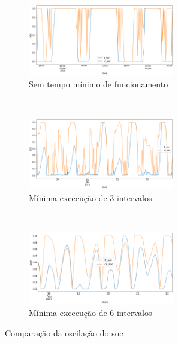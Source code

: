 
\begin{figure}[H]
	\centering
	\begin{subfigure}{\textwidth}
		\centering
		\includegraphics[width=0.7\textwidth]{../img/soc.png}
		\caption{Sem tempo mínimo de funcionamento}\label{fig:soc0}
	\end{subfigure}
	\\ \vspace{1cm}
	\begin{subfigure}{\textwidth}
		\centering
		\includegraphics[width=0.7\textwidth]{../img/soc_3.png}
		\caption{Mínima excecução de 3 intervalos}\label{fig:soc3}
	\end{subfigure}
	\\ \vspace{1cm}
	\begin{subfigure}{\textwidth}
		\centering
		\includegraphics[width=0.7\textwidth]{../img/soc_6.png}
		\caption{Mínima excecução de 6 intervalos}\label{fig:soc6}
	\end{subfigure}
	\caption{Comparação da oscilação do \acrshort{soc}}\label{fig:soc}
\end{figure}
